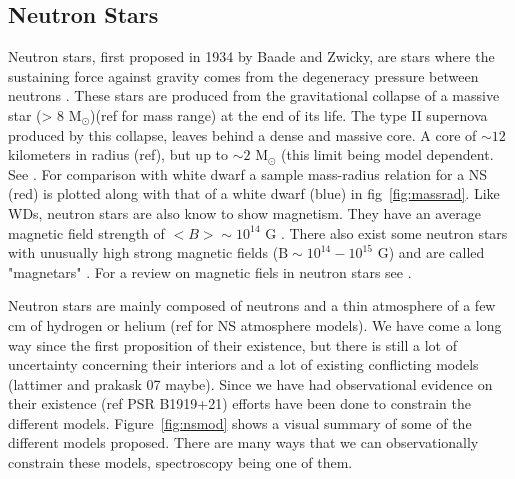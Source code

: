 \subsection{Neutron Stars}\label{sec:ns}

Neutron stars, first proposed in 1934 by Baade and Zwicky,  are stars where the sustaining force against gravity comes from  the degeneracy pressure between neutrons \citep{baade_cosmic_1934}. These stars are produced from the gravitational collapse of a massive star (> 8 M$_\odot$)(ref for mass range) at the end of its life. The type II supernova produced by this collapse, leaves behind a dense and massive core. A core of $\sim 12$ kilometers in radius (ref), but up to $\sim 2$ M$_\odot$ (this limit being model dependent. See \cite{lattimer_neutron_2007}. For comparison with white dwarf a sample mass-radius relation for a NS (red) is plotted along with that of a white dwarf (blue) in fig~\ref{fig:massrad}. Like WDs, neutron stars are also know to show magnetism. They have an average magnetic field strength of $<B>\sim 10^{14}$ G \citep{beskin2015magnetic}. There also exist some neutron stars with unusually high strong magnetic fields ($\text{B}\sim 10^{14} - 10^{15}\text{ G}$) and are called "magnetars" \citep{duncan_formation_1992}. For a review on magnetic fiels in neutron stars see \cite{reisenegger_magnetic_2005}. 

Neutron stars are mainly composed of neutrons and a thin atmosphere of a few cm of hydrogen or helium (ref for NS atmosphere models). We have come a long way since the first proposition of their existence, but there is still a lot of  uncertainty concerning their interiors and a lot of existing conflicting models (lattimer and prakask 07 maybe). Since we have had observational evidence on their existence (ref PSR B1919+21) efforts have been done to constrain the different models. Figure~\ref{fig:nsmod} shows a visual summary of some of the different models proposed. There are many ways that we can observationally constrain these models, spectroscopy being one of them.


